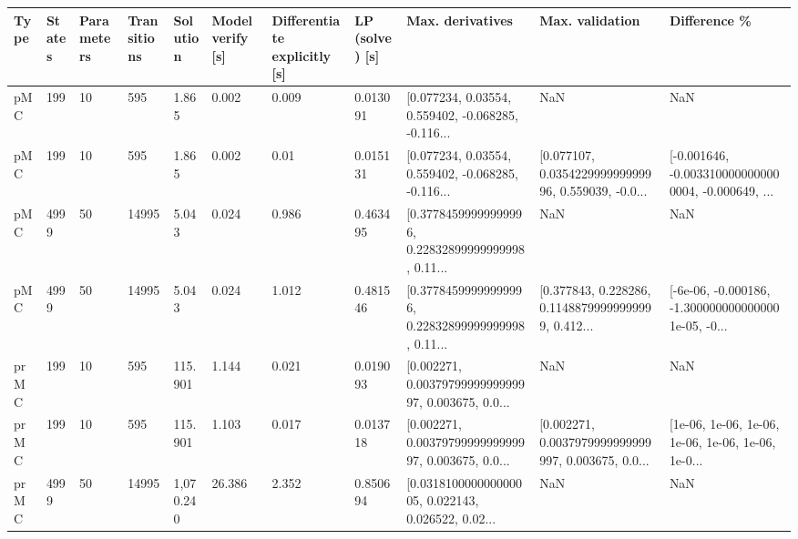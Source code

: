\begin{tabular}{lllllllllll}
\toprule
Type & States & Parameters & Transitions &  Solution & Model verify [s] & Differentiate explicitly [s] & LP (solve) [s] &                                   Max. derivatives &                                    Max. validation &                                       Difference \% \\
\midrule
 pMC &    199 &         10 &         595 &     1.865 &            0.002 &                        0.009 &       0.013091 & [0.077234, 0.03554, 0.559402, -0.068285, -0.116... &                                                NaN &                                                NaN \\
 pMC &    199 &         10 &         595 &     1.865 &            0.002 &                         0.01 &       0.015131 & [0.077234, 0.03554, 0.559402, -0.068285, -0.116... & [0.077107, 0.035422999999999996, 0.559039, -0.0... & [-0.001646, -0.0033100000000000004, -0.000649, ... \\
 pMC &   4999 &         50 &       14995 &     5.043 &            0.024 &                        0.986 &       0.463495 & [0.37784599999999996, 0.22832899999999998, 0.11... &                                                NaN &                                                NaN \\
 pMC &   4999 &         50 &       14995 &     5.043 &            0.024 &                        1.012 &       0.481546 & [0.37784599999999996, 0.22832899999999998, 0.11... & [0.377843, 0.228286, 0.11488799999999999, 0.412... & [-6e-06, -0.000186, -1.3000000000000001e-05, -0... \\
prMC &    199 &         10 &         595 &   115.901 &            1.144 &                        0.021 &       0.019093 & [0.002271, 0.0037979999999999997, 0.003675, 0.0... &                                                NaN &                                                NaN \\
prMC &    199 &         10 &         595 &   115.901 &            1.103 &                        0.017 &       0.013718 & [0.002271, 0.0037979999999999997, 0.003675, 0.0... & [0.002271, 0.0037979999999999997, 0.003675, 0.0... & [1e-06, 1e-06, 1e-06, 1e-06, 1e-06, 1e-06, 1e-0... \\
prMC &   4999 &         50 &       14995 & 1,070.240 &           26.386 &                        2.352 &       0.850694 & [0.031810000000000005, 0.022143, 0.026522, 0.02... &                                                NaN &                                                NaN \\
\bottomrule
\end{tabular}
